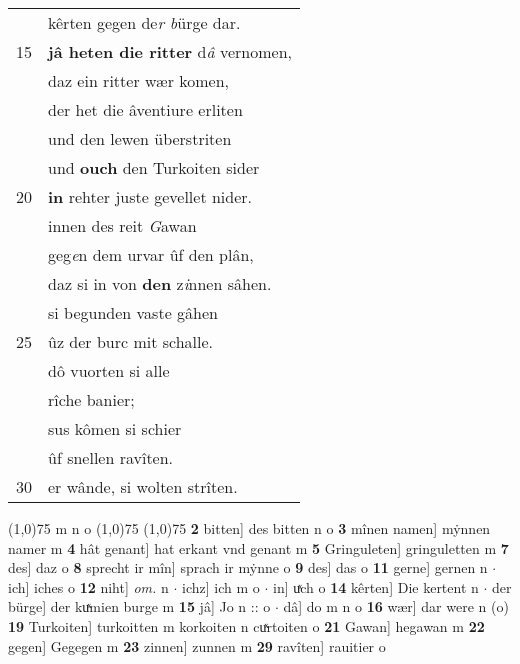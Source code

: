 \documentclass[8pt,a4paper,notitlepage]{article}
\begin{document}
\begin{table}[ht]
\begin{minipage}[t]{0.5\linewidth}
\begin{tabular}{rl}
 & kêrten gegen de\textit{r b}ürge dar.\\ 
15 & \textbf{jâ heten die ritter} d\textit{â} vernomen,\\ 
 & daz ein ritter wær komen,\\ 
 & der het die âventiure erliten\\ 
 & und den lewen überstriten\\ 
 & und \textbf{ouch} den Turkoiten sider\\ 
20 & \textbf{in} rehter juste gevellet nider.\\ 
 & innen des reit \textit{G}awan\\ 
 & geg\textit{e}n dem urvar ûf den plân,\\ 
 & daz si in von \textbf{den} z\textit{i}nnen sâhen.\\ 
 & si begunden vaste gâhen\\ 
25 & ûz der burc mit schalle.\\ 
 & dô vuorten si alle\\ 
 & rîche banier;\\ 
 & sus kômen si schier\\ 
 & ûf snellen ravîten.\\ 
30 & er wânde, si wolten strîten.\\ 
\end{tabular}
\scriptsize
\line(1,0){75} \newline
m n o \newline
\line(1,0){75} \newline
\newline
\line(1,0){75} \newline
\textbf{2} bitten] des bitten n o \textbf{3} mînen namen] mẏnnen namer m \textbf{4} hât genant] hat erkant vnd genant m \textbf{5} Gringuleten] gringuletten m \textbf{7} des] daz o \textbf{8} sprecht ir mîn] sprach ir mẏnne o \textbf{9} des] das o \textbf{11} gerne] gernen n  $\cdot$ ich] iches o \textbf{12} niht] \textit{om.} n  $\cdot$ ichz] ich m o  $\cdot$ in] uͯch o \textbf{14} kêrten] Die kertent n  $\cdot$ der bürge] der kuͯmien burge m \textbf{15} jâ] Jo n :: o  $\cdot$ dâ] do m n o \textbf{16} wær] dar were n (o) \textbf{19} Turkoiten] turkoitten m korkoiten n cuͯrtoiten o \textbf{21} Gawan] hegawan m \textbf{22} gegen] Gegegen m \textbf{23} zinnen] zunnen m \textbf{29} ravîten] rauitier o \newline
\end{minipage}
\end{table}
\newpage
\end{document}
